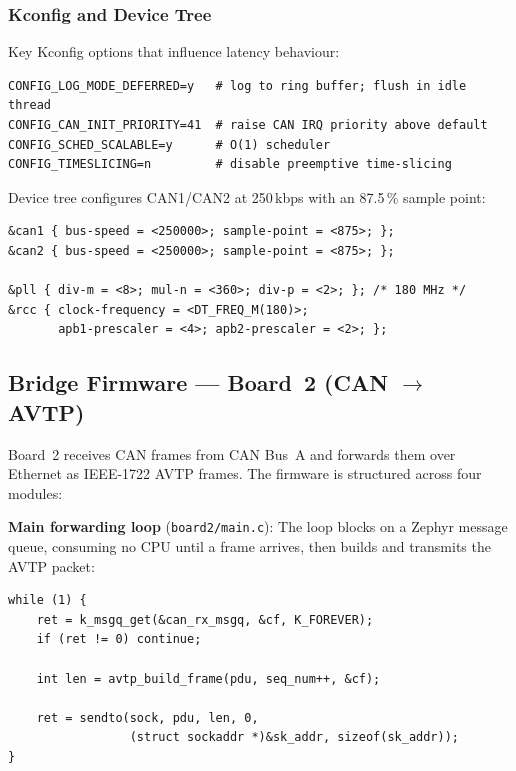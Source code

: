 \documentclass[11pt,a4paper]{article}
\begin{document}
\subsubsection{Kconfig and Device Tree}

Key Kconfig options that influence latency behaviour:

\begin{lstlisting}[caption={prj.conf --- options affecting determinism}]
CONFIG_LOG_MODE_DEFERRED=y   # log to ring buffer; flush in idle thread
CONFIG_CAN_INIT_PRIORITY=41  # raise CAN IRQ priority above default
CONFIG_SCHED_SCALABLE=y      # O(1) scheduler
CONFIG_TIMESLICING=n         # disable preemptive time-slicing
\end{lstlisting}

Device tree configures CAN1/CAN2 at 250\,kbps with an 87.5\,\% sample point:

\begin{lstlisting}[caption={nucleo\_f439zi.overlay --- CAN and PLL configuration}]
&can1 { bus-speed = <250000>; sample-point = <875>; };
&can2 { bus-speed = <250000>; sample-point = <875>; };

&pll { div-m = <8>; mul-n = <360>; div-p = <2>; }; /* 180 MHz */
&rcc { clock-frequency = <DT_FREQ_M(180)>;
       apb1-prescaler = <4>; apb2-prescaler = <2>; };
\end{lstlisting}

\subsection{Bridge Firmware --- Board~2 (CAN \texorpdfstring{$\rightarrow$}{->} AVTP)}
\label{sec:board2fw}

Board~2 receives CAN frames from CAN Bus~A and forwards them over Ethernet as IEEE-1722
AVTP frames.  The firmware is structured across four modules:

\textbf{Main forwarding loop} (\texttt{board2/main.c}): The loop blocks on a Zephyr
message queue, consuming no CPU until a frame arrives, then builds and transmits the
AVTP packet:

\begin{lstlisting}[style=cstyle, caption={board2/main.c --- CAN-to-AVTP forwarding loop}]
while (1) {
    ret = k_msgq_get(&can_rx_msgq, &cf, K_FOREVER);
    if (ret != 0) continue;

    int len = avtp_build_frame(pdu, seq_num++, &cf);

    ret = sendto(sock, pdu, len, 0,
                 (struct sockaddr *)&sk_addr, sizeof(sk_addr));
}
\end{lstlisting}
\end{document}
